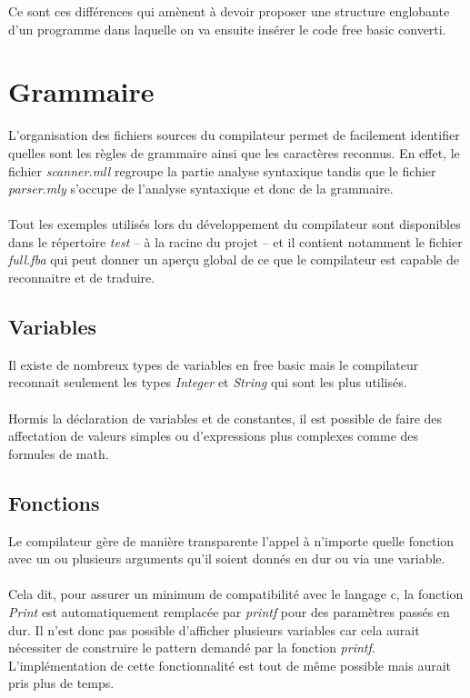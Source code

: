 \documentclass{article}
\begin{document}
Ce sont ces différences qui amènent à devoir proposer une structure englobante d'un 
programme dans laquelle on va ensuite insérer le code free basic converti.
	
\section{Grammaire}
L'organisation des fichiers sources du compilateur permet de facilement identifier quelles sont 
les règles de grammaire ainsi que les caractères reconnus.
En effet, le fichier \emph{scanner.mll} regroupe la partie analyse syntaxique tandis que le fichier 
\emph{parser.mly} s'occupe de l'analyse syntaxique et donc de la grammaire.
\\\\
Tout les exemples utilisés lors du développement du compilateur sont disponibles dans le répertoire 
\emph{test} -- à la racine du projet -- et il contient notamment le fichier \emph{full.fba} qui peut 
donner un aperçu global de ce que le compilateur est capable de reconnaitre et de traduire.

\subsection{Variables}
Il existe de nombreux types de variables en free basic mais le compilateur reconnait seulement les types \emph{Integer}
et \emph{String} qui sont les plus utilisés. 
\\\\
Hormis la déclaration de variables et de constantes, il est possible de faire des affectation de valeurs simples
ou d'expressions plus complexes comme des formules de math.

\subsection{Fonctions}
Le compilateur gère de manière transparente l'appel à n'importe quelle fonction avec un ou plusieurs arguments
qu'il soient donnés en dur ou via une variable.
\\\\
Cela dit, pour assurer un minimum de compatibilité avec le langage c, la fonction \emph{Print} est automatiquement
remplacée par \emph{printf} pour des paramètres passés en dur. Il n'est donc pas possible d'afficher plusieurs 
variables car cela aurait nécessiter de construire le pattern demandé par la fonction \emph{printf}. 
L'implémentation de cette fonctionnalité est tout de même possible mais aurait pris plus de temps.
\end{document}
